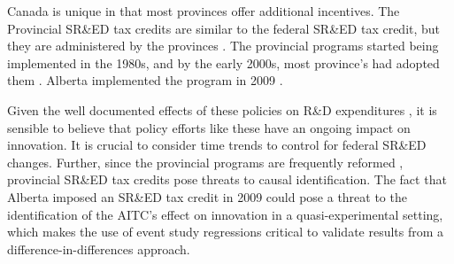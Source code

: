 \documentclass[../main.tex]{subfiles}
\begin{document}
Canada is unique in that most provinces offer additional incentives. The Provincial SR\&ED tax credits are similar to the federal SR\&ED tax credit, but they are administered by the provinces \parencite{warda00}. The provincial programs started being implemented in the 1980s, and by the early 2000s, most province's had adopted them \parencite{warda98,mckenzie05}. Alberta implemented the program in 2009 \parencite{brouillete13}.

Given the well documented effects of these policies on R\&D expenditures \parencite{mansfield_switzer85b, agrawal_etal20, becker15}, it is sensible to believe that policy efforts like these have an ongoing impact on innovation. It is crucial to consider time trends to control for federal SR\&ED changes. Further, since the provincial programs are frequently reformed \parencite{mckenzie05}, provincial SR\&ED tax credits pose threats to causal identification. The fact that Alberta imposed an SR\&ED tax credit in 2009 could pose a threat to the identification of the AITC's effect on innovation in a quasi-experimental setting, which makes the use of event study regressions critical to validate results from a difference-in-differences approach.
\end{document}
